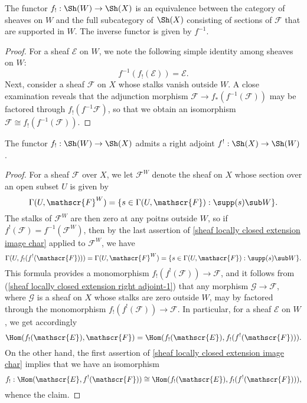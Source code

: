 \begin{proposition}\label{sheaf locally closed extension image char}
The functor $f_!:\Sh(W)\to\Sh(X)$ is an equivalence between the category of sheaves on $W$ and the full subcategory of $\Sh(X)$ consisting of sections of $\mathscr{F}$ that are supported in $W$. The inverse functor is given by $f^{-1}$.
\end{proposition}
\begin{proof}
For a sheaf $\mathscr{E}$ on $W$, we note the following simple identity among sheaves on $W$:
\[f^{-1}(f_!(\mathscr{E}))=\mathscr{E}.\]
Next, consider a sheaf $\mathscr{F}$ on $X$ whose stalks vanish outside $W$. A close examination reveals that the adjunction morphism $\mathscr{F}\to f_*(f^{-1}(\mathscr{F}))$ may be factored through $f_!(f^{-1}\mathscr{F})$, so that we obtain an isomorphism $\mathscr{F}\cong f_!(f^{-1}(\mathscr{F}))$.
\end{proof}

\begin{proposition}\label{sheaf locally closed extension right adjoint}
The functor $f_!:\Sh(W)\to\Sh(X)$ admits a right adjoint $f^!:\Sh(X)\to\Sh(W)$. 
\end{proposition}
\begin{proof}
For a sheaf $\mathscr{F}$ over $X$, we let $\mathscr{F}^W$ denote the sheaf on $X$ whose section over an open subset $U$ is given by
\[\Gamma(U,\mathscr{F}^W)=\{s\in\Gamma(U,\mathscr{F}):\supp(s)\sub W\}.\]
The stalks of $\mathscr{F}^W$ are then zero at any poitns outside $W$, so if $f^!(\mathscr{F})=f^{-1}(\mathscr{F}^W)$, then by the last assertion of \cref{sheaf locally closed extension image char} applied to $\mathscr{F}^W$, we have
\begin{equation}\label{sheaf locally closed extension right adjoint-1}
\Gamma(U,f_!(f^!(\mathscr{F})))=\Gamma(U,\mathscr{F}^W)=\{s\in\Gamma(U,\mathscr{F}):\supp(s)\sub W\}.
\end{equation}
This formula provides a monomorphism $f_!(f^!(\mathscr{F}))\to\mathscr{F}$, and it follows from (\ref{sheaf locally closed extension right adjoint-1}) that any morphism $\mathscr{G}\to\mathscr{F}$, where $\mathscr{G}$ is a sheaf on $X$ whose stalks are zero outside $W$, may by factored through the monomorphism $f_!(f^!(\mathscr{F}))\to\mathscr{F}$. In particular, for a sheaf $\mathscr{E}$ on $W$, we get accordingly
\[\Hom(f_!(\mathscr{E}),\mathscr{F})=\Hom(f_!(\mathscr{E}),f_!(f^!(\mathscr{F}))).\]
On the other hand, the first assertion of \cref{sheaf locally closed extension image char} implies that we have an isomorphism
\[f_!:\Hom(\mathscr{E},f^!(\mathscr{F}))\cong \Hom(f_!(\mathscr{E}),f_!(f^!(\mathscr{F}))),\]
whence the claim.
\end{proof}

